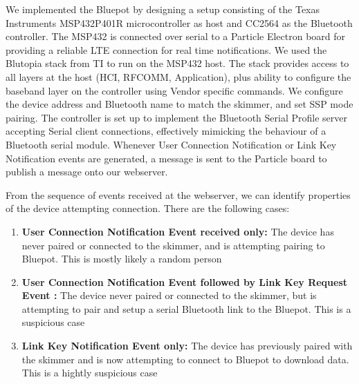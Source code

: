 We implemented the Bluepot by designing a setup consisting of the Texas Instruments MSP432P401R microcontroller as host and CC2564 as the Bluetooth controller. The MSP432 is connected over serial to a Particle Electron board for providing a reliable LTE connection for real time notifications. We used the Blutopia stack from TI to run on the MSP432 host. The stack provides access to all layers at the host (HCI, RFCOMM, Application), plus ability to configure the baseband layer on the controller using Vendor specific commands. We configure the device address and Bluetooth name to match the skimmer, and set SSP mode pairing. The controller is set up to implement the Bluetooth Serial Profile server accepting Serial client connections, effectively mimicking the behaviour of a Bluetooth serial module. Whenever User Connection Notification or Link Key Notification events are generated, a message is sent to the Particle board to publish a message onto our webserver. 

From the sequence of events received at the webserver, we can identify properties of the device attempting connection. There are the following cases:
\begin{enumerate}
	\item \textbf{User Connection Notification Event received only:} The device has never paired or connected to the skimmer, and is attempting pairing to Bluepot. This is mostly likely a random person
	\item \textbf{User Connection Notification Event followed by Link Key Request Event :} The device never paired or connected to the skimmer, but is attempting to pair and setup a serial Bluetooth link to the Bluepot. This is a suspicious case
	\item \textbf{Link Key Notification Event only: } The device has previously paired with the skimmer and is now attempting to connect to Bluepot to download data. This is a hightly suspicious case

\end{enumerate}

